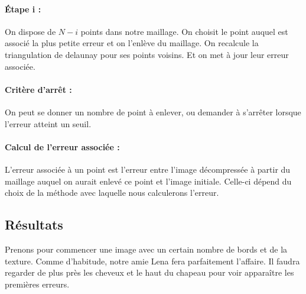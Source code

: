 \documentclass{report}
\begin{document}
\paragraph{Étape i :}

On dispose de $N-i$ points dans notre maillage.
On choisit le point auquel est associé la plus petite erreur et on l'enlève du maillage.
On recalcule la triangulation de delaunay pour ses points voisins.
Et on met à jour leur erreur associée.

\paragraph{Critère d'arrêt :}
On peut se donner un nombre de point à enlever, ou demander à s'arrêter lorsque l'erreur atteint un seuil.

\paragraph{Calcul de l'erreur associée :}
L'erreur associée à un point est l'erreur entre l'image décompressée à partir du maillage auquel on aurait enlevé ce point et l'image initiale. Celle-ci dépend du choix de la méthode avec laquelle nous calculerons l'erreur.

\subsection{Résultats}

Prenons pour commencer une image avec un certain nombre de bords et de la texture. Comme d'habitude, notre amie Lena fera parfaitement l'affaire. Il faudra regarder de plus près les cheveux et le haut du chapeau pour voir apparaître les premières erreurs.
\end{document}
